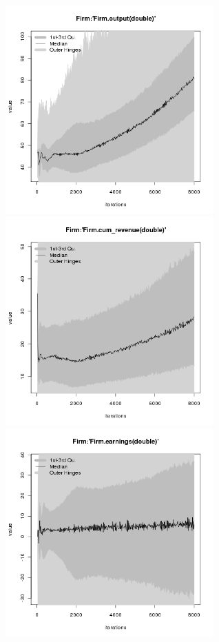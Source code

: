 \begin{figure}[H!]
\centering\leavevmode
\begin{minipage}{17cm}
\centering\leavevmode
\includegraphics[width=8cm]{./benchmark_plots/Firm-output.png}
\includegraphics[width=8cm]{./benchmark_plots/Firm-cum_revenue.png}\\
\includegraphics[width=8cm]{./benchmark_plots/Firm-earnings.png}

\end{minipage}
\end{figure}

